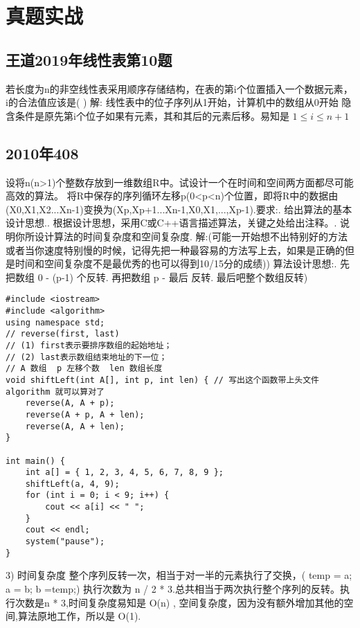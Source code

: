 \section{真题实战}

\subsection{王道2019年线性表第10题}
若长度为n的非空线性表采用顺序存储结构，在表的第i个位置插入一个数据元素，i的合法值应该是(   )
解:\newline
线性表中的位子序列从{\color{red}1}开始，计算机中的数组从{\color{red}0}开始\newline
隐含条件是原先第i个位子如果有元素，其和其后的元素后移。易知是  $ 1 \le i \le n+1 $

\subsection{2010年408}
设将n(n>1)个整数存放到一维数组R中。试设计一个在时间和空间两方面都尽可能高效的算法。
将R中保存的序列循环左移p(0<p<n)个位置，即将R中的数据由(X0,X1,X2...Xn-1)变换为(Xp,Xp+1...Xn-1,X0,X1,...,Xp-1).要求:. 给出算法的基本设计思想.. 根据设计思想，采用C或C++语言描述算法，关键之处给出注释。. 说明你所设计算法的时间复杂度和空间复杂度. \newline
解:(可能一开始想不出特别好的方法或者当你速度特别慢的时候，记得先把一种最容易的方法写上去，如果是正确的但是时间和空间复杂度不是最优秀的也可以得到10/15分的成绩)) 算法设计思想:. 先把数组 0 - (p-1) 个反转. 再把数组 p - 最后 反转. 最后吧整个数组反转)\newline
\begin{lstlisting}[basicstyle=\small\ttfamily, caption={}, numbers=none]
#include <iostream>
#include <algorithm>
using namespace std;
// reverse(first, last)
// (1) first表示要排序数组的起始地址；
// (2) last表示数组结束地址的下一位；
// A 数组  p 左移个数  len 数组长度
void shiftLeft(int A[], int p, int len) { // 写出这个函数带上头文件 algorithm 就可以算对了
	reverse(A, A + p);
	reverse(A + p, A + len);
	reverse(A, A + len);
}

int main() {
	int a[] = { 1, 2, 3, 4, 5, 6, 7, 8, 9 };
	shiftLeft(a, 4, 9);
	for (int i = 0; i < 9; i++) {
		cout << a[i] << " ";
	}
	cout << endl;
	system("pause");
}
\end{lstlisting}
3)\newline
时间复杂度\newline
整个序列反转一次，相当于对一半的元素执行了交换，( temp = a; a = b; b =temp;) 执行次数为 n / 2 * 3.总共相当于两次执行整个序列的反转。执行次数是n * 3,时间复杂度易知是 O(n) , 空间复杂度，因为没有额外增加其他的空间,算法原地工作，所以是 O(1).\newline

